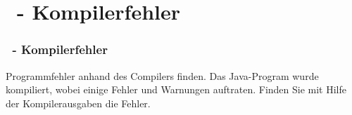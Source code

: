 \def\stitle{\theexercise\ - Kompilerfehler}
\section{\stitle}

\begin{frame}[t]%
\frametitle{\stitle}
\medskip
Programmfehler anhand des Compilers finden.
\newline
Das Java-Program  wurde kompiliert, wobei einige Fehler und Warnungen auftraten.
Finden Sie mit Hilfe der Kompilerausgaben die Fehler.

 \end{frame}
